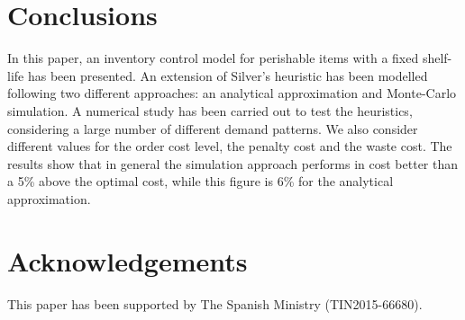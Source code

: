 \documentclass{tPRS2e}
\begin{document}
\section{Conclusions}
\label{sec:conclusions}

In this paper, an inventory control model for perishable items with a fixed shelf-life has been presented. An extension of Silver's heuristic has been modelled following two different approaches: an analytical approximation and Monte-Carlo simulation.  A numerical study has been carried out to test the heuristics, considering a large number of different demand patterns. We also consider different values for the order cost level, the penalty cost and the waste cost. The results show that in general the simulation approach performs in cost better than a 5\% above the optimal cost, while this figure is 6\% for the analytical approximation. 


\section*{Acknowledgements}
This paper has been supported by The Spanish Ministry (TIN2015-66680).


\end{document}
